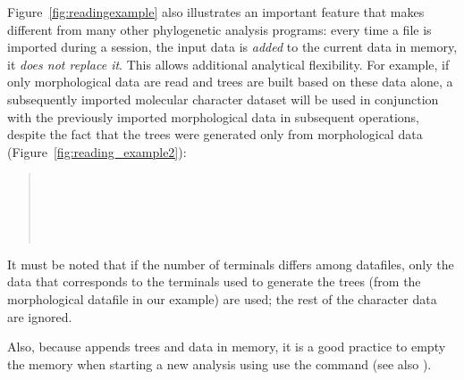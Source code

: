 Figure~\ref{fig:readingexample} also illustrates an important feature that makes \poy
different from many other phylogenetic analysis programs: every
time a file is imported during a \poy session, the input data is \emph{added} to the current data in memory, it \emph{does not replace it}. This allows additional analytical flexibility. For example, if only morphological data are read and trees are built based on these data alone, a subsequently imported molecular character dataset will be used in conjunction with the previously imported morphological data in subsequent operations, despite the fact that the trees were generated only from morphological data (Figure~\ref{fig:reading_example2}):

\begin{quote}
\\
\\
\\
\\
\end{quote}

It must be noted that if the number of terminals differs among datafiles, only the data that corresponds to the terminals used to generate the trees (from the morphological datafile in our example) are used; the rest of the character data are ignored.

Also, because \poy appends trees and data in memory, it is a good practice to empty the memory when starting a new analysis using use the  command (see also ).

